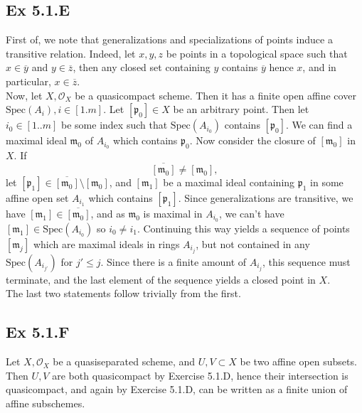 \documentclass{article}
\theoremstyle{definition}
\newcommand{\Spec}{\text{Spec}}
\begin{document}
\subsection*{Ex 5.1.E}

First of, we note that generalizations and specializations of points induce a
transitive relation. Indeed, let $x, y, z$ be points in a topological space
such that $x \in \overline{y}$ and $y \in \overline{z}$, then any closed set
containing $y$ contains $\overline{y}$ hence $x$, and in particular, $x \in
\overline{z}$. \\

Now, let $X, \mathcal{O}_X$ be a quasicompact scheme. Then it has a finite open
affine cover $\Spec(A_i), i \in [1.m]$. Let $[\mathfrak{p}_0] \in X$ be an
arbitrary point. Then let $i_0 \in [1..m]$ be some index such that
$\Spec(A_{i_0})$ contains $[\mathfrak{p}_0]$. We can find a maximal ideal
$\mathfrak{m}_0$ of $A_{i_0}$ which contains $\mathfrak{p}_0$. Now consider the
closure of $[\mathfrak{m}_0]$ in $X$. If 
\[
	\overline{[\mathfrak{m}_0]} \not = [\mathfrak{m}_0],
\] 
let $[\mathfrak{p}_1] \in \overline{[\mathfrak{m}_0]} \setminus
[\mathfrak{m_0}]$, and $[\mathfrak{m}_1]$ be a maximal ideal containing
$\mathfrak{p}_1$ in some affine open set $A_{i_1}$ which contains
$[\mathfrak{p}_1]$. Since generalizations are transitive, we have
$[\mathfrak{m}_1] \in \overline{[\mathfrak{m}_0]}$, and as $\mathfrak{m}_0$ is
maximal in $A_{i_0}$, we can't have $[\mathfrak{m}_1] \in \Spec(A_{i_0})$ so
$i_0 \not = i_1$. Continuing this way yields a sequence of points
$[\mathfrak{m}_{j}]$ which are maximal ideals in rings $A_{i_j}$, but not
contained in any $\Spec(A_{i_{j'}})$ for $j' \le j$. Since there is a finite
amount of $A_{i_j}$, this sequence must terminate, and the last element of the
sequence yields a closed point in $X$. \\

The last two statements follow trivially from the first.

\subsection*{Ex 5.1.F}

Let $X, \mathcal{O}_X$ be a quasiseparated scheme, and $U, V \subset X$ be two
affine open subsets. Then $U, V$ are both quasicompact by Exercise 5.1.D, hence
their intersection is quasicompact, and again by Exercise 5.1.D, can be written
as a finite union of affine subschemes. \\
\end{document}
